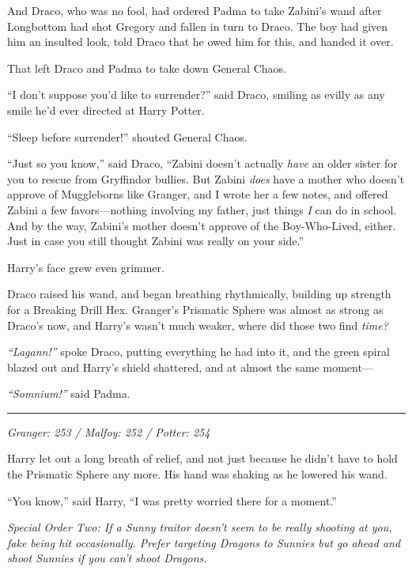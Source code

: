And Draco, who was no fool, had ordered Padma to take Zabini's wand
after Longbottom had shot Gregory and fallen in turn to Draco. The boy
had given him an insulted look, told Draco that he owed him for this,
and handed it over.

That left Draco and Padma to take down General Chaos.

``I don't suppose you'd like to surrender?'' said Draco, smiling as
evilly as any smile he'd ever directed at Harry Potter.

``Sleep before surrender!'' shouted General Chaos.

``Just so you know,'' said Draco, ``Zabini doesn't actually \emph{have}
an older sister for you to rescue from Gryffindor bullies. But Zabini
\emph{does} have a mother who doesn't approve of Muggleborns like
Granger, and I wrote her a few notes, and offered Zabini a few
favors---nothing involving my father, just things \emph{I} can do in
school. And by the way, Zabini's mother doesn't approve of the
Boy-Who-Lived, either. Just in case you still thought Zabini was really
on your side.''

Harry's face grew even grimmer.

Draco raised his wand, and began breathing rhythmically, building up
strength for a Breaking Drill Hex. Granger's Prismatic Sphere was almost
as strong as Draco's now, and Harry's wasn't much weaker, where did
those two find \emph{time?}

\emph{``Lagann!''} spoke Draco, putting everything he had into it, and
the green spiral blazed out and Harry's shield shattered, and at almost
the same moment---

\emph{``Somnium!''} said Padma.

\begin{center}\rule{3in}{0.4pt}\end{center}

\emph{Granger: 253 / Malfoy: 252 / Potter: 254}

Harry let out a long breath of relief, and not just because he didn't
have to hold the Prismatic Sphere any more. His hand was shaking as he
lowered his wand.

``You know,'' said Harry, ``I was pretty worried there for a moment.''

\emph{Special Order Two: If a Sunny traitor doesn't seem to be really
shooting at you, fake being hit occasionally. Prefer targeting Dragons
to Sunnies but go ahead and shoot Sunnies if you can't shoot Dragons.}

